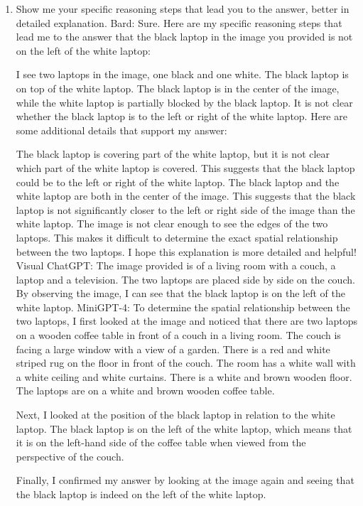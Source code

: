 \begin{enumerate}
    I hope this is helpful!
    \subitem Visual ChatGPT: Yes, the black laptop is on the left of the white laptop.
    \subitem MiniGPT-4: Yes, the black laptop is on the left of the white laptop.
    \item Show me your specific reasoning steps that lead you to the answer, better in detailed explanation.
    \subitem Bard: Sure. Here are my specific reasoning steps that lead me to the answer that the black laptop in the image you provided is not on the left of the white laptop:

    I see two laptops in the image, one black and one white.
    The black laptop is on top of the white laptop.
    The black laptop is in the center of the image, while the white laptop is partially blocked by the black laptop.
    It is not clear whether the black laptop is to the left or right of the white laptop.
    Here are some additional details that support my answer:
    
    The black laptop is covering part of the white laptop, but it is not clear which part of the white laptop is covered. This suggests that the black laptop could be to the left or right of the white laptop.
    The black laptop and the white laptop are both in the center of the image. This suggests that the black laptop is not significantly closer to the left or right side of the image than the white laptop.
    The image is not clear enough to see the edges of the two laptops. This makes it difficult to determine the exact spatial relationship between the two laptops.
    I hope this explanation is more detailed and helpful!
    \subitem Visual ChatGPT: The image provided is of a living room with a couch, a laptop and a television. The two laptops are placed side by side on the couch. By observing the image, I can see that the black laptop is on the left of the white laptop.
    \subitem MiniGPT-4: To determine the spatial relationship between the two laptops, I first looked at the image and noticed that there are two laptops on a wooden coffee table in front of a couch in a living room. The couch is facing a large window with a view of a garden. There is a red and white striped rug on the floor in front of the couch. The room has a white wall with a white ceiling and white curtains. There is a white and brown wooden floor. The laptops are on a white and brown wooden coffee table.

    Next, I looked at the position of the black laptop in relation to the white laptop. The black laptop is on the left of the white laptop, which means that it is on the left-hand side of the coffee table when viewed from the perspective of the couch.
    
    Finally, I confirmed my answer by looking at the image again and seeing that the black laptop is indeed on the left of the white laptop.
\end{enumerate}
